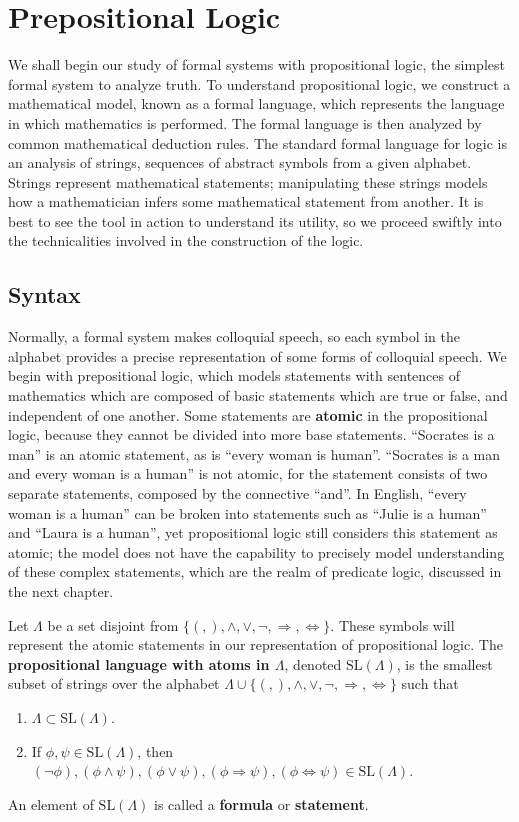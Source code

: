 \chapter{Prepositional Logic}

We shall begin our study of formal systems with propositional logic, the simplest formal system to analyze truth. To understand propositional logic, we construct a mathematical model, known as a formal language, which represents the language in which mathematics is performed. The formal language is then analyzed by common mathematical deduction rules. The standard formal language for logic is an analysis of strings, sequences of abstract symbols from a given alphabet. Strings represent mathematical statements; manipulating these strings models how a mathematician infers some mathematical statement from another. It is best to see the tool in action to understand its utility, so we proceed swiftly into the technicalities involved in the construction of the logic.

\section{Syntax}

Normally, a formal system makes colloquial speech, so each symbol in the alphabet provides a precise representation of some forms of colloquial speech. We begin with prepositional logic, which models statements with sentences of mathematics which are composed of basic statements which are true or false, and independent of one another. Some statements are {\bf atomic} in the propositional logic, because they cannot be divided into more base statements. ``Socrates is a man'' is an atomic statement, as is ``every woman is human''. ``Socrates is a man and every woman is a human'' is not atomic, for the statement consists of two separate statements, composed by the connective ``and''. In English, ``every woman is a human'' can be broken into statements such as ``Julie is a human'' and ``Laura is a human'', yet propositional logic still considers this statement as atomic; the model does not have the capability to precisely model understanding of these complex statements, which are the realm of predicate logic, discussed in the next chapter.

Let $\Lambda$ be a set disjoint from $\{ (, ), \wedge, \vee, \neg, \Rightarrow, \Leftrightarrow \}$. These symbols will represent the atomic statements in our representation of propositional logic. The {\bf propositional language with atoms in $\Lambda$}, denoted $\text{SL}(\Lambda)$, is the smallest subset of strings over the alphabet $\Lambda \cup \{ (, ), \wedge, \vee, \neg, \Rightarrow, \Leftrightarrow \}$ such that
%
\begin{enumerate}
    \item $\Lambda \subset \text{SL}(\Lambda)$.
    \item If $\phi, \psi \in \text{SL}(\Lambda)$, then $(\neg \phi), (\phi \wedge \psi), (\phi \vee \psi), (\phi \Rightarrow \psi), (\phi \Leftrightarrow \psi) \in \text{SL}(\Lambda)$.
\end{enumerate}
%
An element of $\text{SL}(\Lambda)$ is called a {\bf formula} or {\bf statement}.

